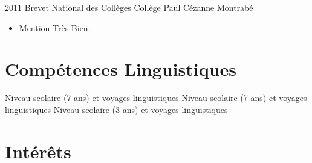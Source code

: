\documentclass[11pt,a4paper]{moderncv}
\begin{document}
\cventry
{2011}
{Brevet National des Collèges}
{Collège Paul Cézanne}
{Montrabé}
{}
{\begin{itemize}
\item Mention Très Bien.
\end{itemize}
}

\section{Compétences Linguistiques}
{Niveau scolaire (7 ans) et voyages linguistiques}{}
{Niveau scolaire (7 ans) et voyages linguistiques}{}
{Niveau scolaire (3 ans) et voyages linguistiques}{}

\section{Intérêts}



\nocite{*}

\end{document}
